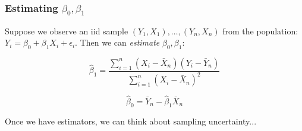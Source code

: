 \documentclass{beamer}
\begin{document}
\begin{frame}
	\frametitle{Estimating $\beta_0, \beta_1$}
Suppose we observe an iid sample $(Y_1, X_1), \hdots, (Y_n, X_n)$ from the population: $Y_i = \beta_0 + \beta_1 X_i + \epsilon_i$. Then we can \emph{estimate} $\beta_0, \beta_1$:

	$$\widehat{\beta}_1 = \frac{\sum_{i=1}^n (X_i - \bar{X}_n) (Y_i - \bar{Y}_n)}{\sum_{i=1}^n (X_i - \bar{X}_n)^2}$$

	
	$$\widehat{\beta}_0 = \bar{Y}_n - \widehat{\beta}_1 \bar{X}_n$$

\vspace{2em}
	\alert{Once we have estimators, we can think about sampling uncertainty...}
\end{frame}

\end{document}
